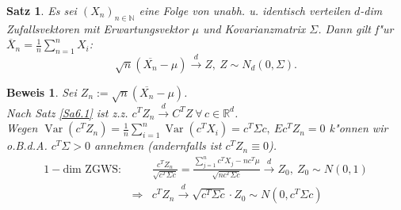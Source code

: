 \documentclass[a4paper,11pt]{book}
\newcommand{\R}{{\mathbb R}}
\newcommand{\N}{{\mathbb N}}
\DeclareMathOperator{\var}{Var}
\def\dto{\stackrel{d}{\rightarrow}}
\newtheorem{Sa}{Satz}[chapter]
\theoremstyle{nonumberplain}
\newtheorem{Bew}{Beweis}
\begin{document}
\begin{Sa} \label{Sa6.5}
Es sei $(X_n)_{n \in \N}$ eine Folge von unabh. u. identisch verteilen $d$-dim Zufallsvektoren mit Erwartungsvektor $\mu$ und Kovarianzmatrix $\Sigma$. Dann gilt f"ur $\overline{X}_n = \frac1{n} \sum_{n=1}^n X_i$:
\[
\sqrt{n} (\overline{X_n} - \mu) \dto Z,\ Z \sim N_d(0,\Sigma).
\]
\end{Sa}

\begin{Bew}
Sei $Z_n := \sqrt{n} (\overline{X_n} - \mu)$.\\
Nach Satz \ref{Sa6.1} ist z.z. $c^T Z_n \dto C^TZ\ \forall\, c \in \R^d$.\\
Wegen $\var(c^T Z_n) = \frac1{n} \sum_{i=1}^n \var(c^T X_i) = c^T \Sigma c,\ Ec^T Z_n = 0$ k"onnen wir o.B.d.A. $c^T \Sigma > 0$ annehmen (andernfalls ist $c^T Z_n \equiv 0$).
\begin{eqnarray*}
1-\text{dim ZGWS}: & & \frac{c^T Z_n}{\sqrt{c^T \Sigma c}} = \frac{\sum_{j=1}^n c^T X_j - n c^T \mu}{\sqrt{n c^T \Sigma c}} \dto Z_0, \ Z_0 \sim N(0,1) \\
& \Rightarrow & c^T Z_n \dto \sqrt{c^T \Sigma c} \cdot Z_0 \sim N(0,c^T \Sigma c)
\end{eqnarray*}
\end{Bew}
\end{document}
